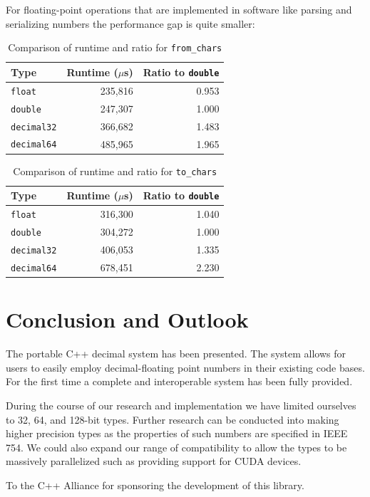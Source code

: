 \documentclass[acmsmall]{acmart}
\newcommand{\code}[1]{\texttt{#1}}
\begin{document}
For floating-point operations that are implemented in software like parsing and serializing numbers the performance gap is quite smaller:

\begin{table}[h]
\centering
\begin{tabular}{|l|r|r|}
\hline
Type & Runtime ($\mu$s) & Ratio to \texttt{double} \\
\hline
\texttt{float} & 235,816 & 0.953 \\
\texttt{double} & 247,307 & 1.000 \\
\texttt{decimal32} & 366,682 & 1.483 \\
\texttt{decimal64} & 485,965 & 1.965 \\
\hline
\end{tabular}
\caption{Comparison of runtime and ratio for \code{from\_chars}}
\label{tab:from-chars-comparison}
\end{table}

\begin{table}[h]
\centering
\begin{tabular}{|l|r|r|}
\hline
Type & Runtime ($\mu$s) & Ratio to \texttt{double} \\
\hline
\texttt{float} & 316,300 & 1.040 \\
\texttt{double} & 304,272 & 1.000 \\
\texttt{decimal32} & 406,053 & 1.335 \\
\texttt{decimal64} & 678,451 & 2.230 \\
\hline
\end{tabular}
\caption{Comparison of runtime and ratio for \code{to\_chars}}
\label{tab:runtime-comparison}
\end{table}

\section{Conclusion and Outlook}

The portable C++ decimal system has been presented.
The system allows for users to easily employ decimal-floating point numbers in their existing code bases.
For the first time a complete and interoperable system has been fully provided.

During the course of our research and implementation we have limited ourselves to 32, 64, and 128-bit types.
Further research can be conducted into making higher precision types as the properties of such numbers are specified in IEEE 754.
We could also expand our range of compatibility to allow the types to be massively parallelized such as providing support for CUDA devices.

\begin{acks}
To the C++ Alliance for sponsoring the development of this library. 
\end{acks}


\nocite{*}

\end{document}
